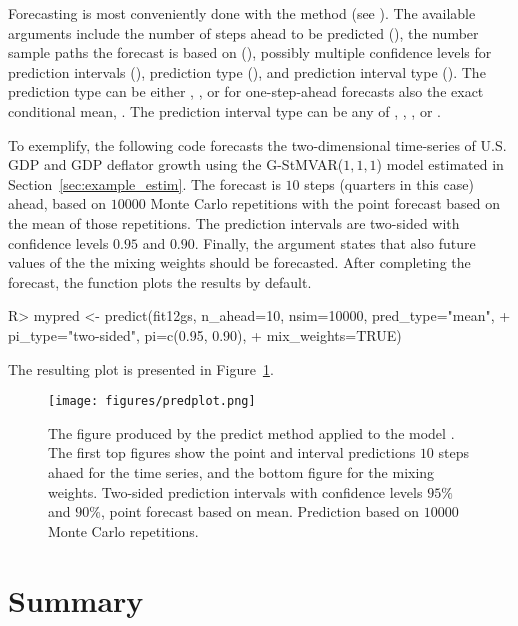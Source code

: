 \documentclass[nojss]{jss}
\begin{document}
Forecasting is most conveniently done with the  method (see ). The available arguments include the number of steps ahead to be predicted (), the number sample paths the forecast is based on (), possibly multiple confidence levels for prediction intervals (), prediction type (), and prediction interval type (). The prediction type can be either , , or for one-step-ahead forecasts also the exact conditional mean, . The prediction interval type can be any of , , , or .

To exemplify, the following code forecasts the two-dimensional time-series of U.S. GDP and GDP deflator growth using the G-StMVAR($1, 1, 1$) model  estimated in Section~\ref{sec:example_estim}. The forecast is $10$ steps (quarters in this case) ahead, based on $10000$ Monte Carlo repetitions with the point forecast based on the mean of those repetitions. The prediction intervals are two-sided with confidence levels $0.95$ and $0.90$. Finally, the argument  states that also future values of the the mixing weights should be forecasted. After completing the forecast, the function plots the results by default.
%
\begin{CodeChunk}
\begin{CodeInput}
R> mypred <- predict(fit12gs, n_ahead=10, nsim=10000, pred_type="mean",
+                    pi_type="two-sided", pi=c(0.95, 0.90),
+                    mix_weights=TRUE)
\end{CodeInput}
\end{CodeChunk}
%
The resulting plot is presented in Figure~\ref{fig:predplot}.


\begin{figure}%
  \centering
  \texttt{[image: figures/predplot.png]}
  \caption{The figure produced by the predict method applied to the model . The first top figures show the point and interval predictions $10$ steps ahaed for the time series, and the bottom figure for the mixing weights. Two-sided prediction intervals with confidence levels $95\%$ and $90\%$, point forecast based on mean. Prediction based on $10000$ Monte Carlo repetitions.}
\label{fig:predplot}
\end{figure}


\section{Summary}\label{sec:summary}
\end{document}

